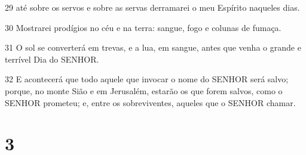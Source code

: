 \par 29 até sobre os servos e sobre as servas derramarei o meu Espírito naqueles dias.
\par 30 Mostrarei prodígios no céu e na terra: sangue, fogo e colunas de fumaça.
\par 31 O sol se converterá em trevas, e a lua, em sangue, antes que venha o grande e terrível Dia do SENHOR.
\par 32 E acontecerá que todo aquele que invocar o nome do SENHOR será salvo; porque, no monte Sião e em Jerusalém, estarão os que forem salvos, como o SENHOR prometeu; e, entre os sobreviventes, aqueles que o SENHOR chamar.

\chapter{3}

